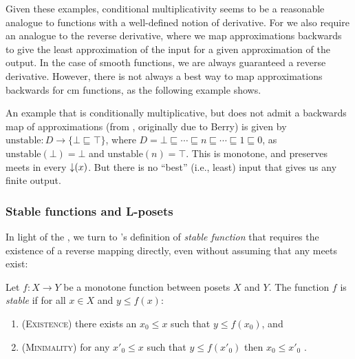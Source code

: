 Given these examples, conditional multiplicativity seems to be a
reasonable analogue to functions with a well-defined notion of
derivative. For \GPS we also require an analogue to the reverse
derivative, where we map approximations backwards to give the least
approximation of the input for a given approximation of the output. In
the case of smooth functions, we are always guaranteed a reverse
derivative. However, there is not always a best way to map
approximations backwards for cm functions, as the following example
shows.

\begin{example}
  \label{ex:non-stable-function}
  An example that is conditionally multiplicative, but does not admit
  a backwards map of approximations (from \citet[just before Lemma
  12.2.3]{amadio-curien}, originally due to Berry) is given by
  $\mathrm{unstable} : D \to \{\bot \sqsubseteq \top\}$, where
  $D = \bot \sqsubseteq \cdots \sqsubseteq n \sqsubseteq \cdots
  \sqsubseteq 1 \sqsubseteq 0$, as $\mathrm{unstable}(\bot) = \bot$
  and $\mathrm{unstable}(n) = \top$. This is monotone, and preserves
  meets in every $\mathop{\downarrow}(x)$. But there is no ``best'' (i.e., least)
  input that gives us any finite output.
\end{example}

\subsubsection{Stable functions and L-posets}
\label{sec:stab}

In light of the , we turn to
\citet{berry79}'s definition of \emph{stable function} that requires
the existence of a reverse mapping directly, even without assuming
that any meets exist:

\begin{definition}
  Let $f : X \to Y$ be a monotone function between posets $X$ and
  $Y$. The function $f$ is \emph{stable} if for all $x \in X$ and
  $y \leq f(x)$:
  \begin{enumerate}
  \item (\textsc{Existence}) there exists an $x_0 \leq x$ such that $y \leq f(x_0)$, and
  \item (\textsc{Minimality}) for any $x'_0 \leq x$ such that $y \leq f(x'_0)$ then
    $x_0 \leq x'_0$ .
  \end{enumerate}
\end{definition}

